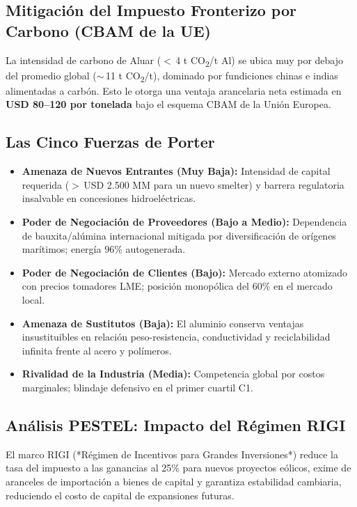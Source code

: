 \documentclass[10pt,a4paper]{article}
\begin{document}
\subsection{Mitigación del Impuesto Fronterizo por Carbono (CBAM de la UE)}
La intensidad de carbono de Aluar ($<$\,4 t CO\textsubscript{2}/t Al) se ubica muy por debajo del promedio global ($\sim$\,11 t CO\textsubscript{2}/t), dominado por fundiciones chinas e indias alimentadas a carbón. Esto le otorga una ventaja arancelaria neta estimada en \textbf{USD 80--120 por tonelada} bajo el esquema CBAM de la Unión Europea.

\subsection{Las Cinco Fuerzas de Porter}
\begin{itemize}
    \item \textbf{Amenaza de Nuevos Entrantes (Muy Baja):} Intensidad de capital requerida ($>$\,USD 2.500 MM para un nuevo smelter) y barrera regulatoria insalvable en concesiones hidroeléctricas.
    \item \textbf{Poder de Negociación de Proveedores (Bajo a Medio):} Dependencia de bauxita/alúmina internacional mitigada por diversificación de orígenes marítimos; energía 96\% autogenerada.
    \item \textbf{Poder de Negociación de Clientes (Bajo):} Mercado externo atomizado con precios tomadores LME; posición monopólica del 60\% en el mercado local.
    \item \textbf{Amenaza de Sustitutos (Baja):} El aluminio conserva ventajas insustituibles en relación peso-resistencia, conductividad y reciclabilidad infinita frente al acero y polímeros.
    \item \textbf{Rivalidad de la Industria (Media):} Competencia global por costos marginales; blindaje defensivo en el primer cuartil C1.
\end{itemize}

\subsection{Análisis PESTEL: Impacto del Régimen RIGI}
El marco RIGI (*Régimen de Incentivos para Grandes Inversiones*) reduce la tasa del impuesto a las ganancias al 25\% para nuevos proyectos eólicos, exime de aranceles de importación a bienes de capital y garantiza estabilidad cambiaria, reduciendo el costo de capital de expansiones futuras.
\end{document}
